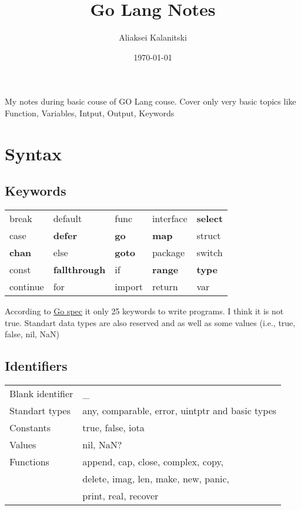 \documentclass[12pt]{article}
\begin{document}
\title{Go Lang Notes}
\author{Aliaksei Kalanitski}
\date{\today}
\maketitle

My notes during basic couse of GO Lang couse. Cover only very basic topics like
Function, Variables, Intput, Output, Keywords

\tableofcontents
\newpage


\section{Syntax}

\subsection{Keywords}
\begin{paracol}{2} \begin{leftcolumn}
\begin{tabular}{lllll}
break       & default       & func      & interface & \textbf{select} \\
case        & \textbf{defer} & \textbf{go} & \textbf{map} & struct \\
\textbf{chan} & else & \textbf{goto}    & package   & switch \\
const         & \textbf{fallthrough}    & if        & \textbf{range} & \textbf{type} \\
continue      & for         & import    & return    & var \\
\end{tabular}
\end{leftcolumn} \begin{rightcolumn}
According to \href{https://go.dev/ref/spec}{Go spec} it only 25 keywords to
write programs. I think it is not true. Standart data types are also reserved
and as well as some values (i.e., true, false, nil, NaN)
\end{rightcolumn}
\end{paracol}

\subsection{Identifiers}
\begin{tabular}{ll}
Blank identifier& \_ \\
Standart types  & any, comparable, error, uintptr and basic types \\
Constants       & true, false, iota \\
Values          & nil, NaN? \\
Functions       & append, cap, close, complex, copy, \\
                & delete, imag, len, make, new, panic, \\
                & print, real, recover

\end{tabular}
\end{document}

